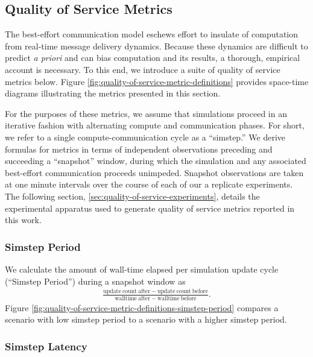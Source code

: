 \subsection{Quality of Service Metrics} \label{sec:quality-of-service-metrics}



The best-effort communication model eschews effort to insulate of computation from real-time message delivery dynamics.
Because these dynamics are difficult to predict \textit{a priori} and can bias computation and its results, a thorough, empirical account is necessary.
To this end, we introduce a suite of quality of service metrics below.
Figure \ref{fig:quality-of-service-metric-definitions} provides space-time diagrams illustrating the metrics presented in this section.

For the purposes of these metrics, we assume that simulations proceed in an iterative fashion with alternating compute and communication phases.
For short, we refer to a single compute-communication cycle as a ``simstep.''
We derive formulas for metrics in terms of independent observations preceding and succeeding a ``snapshot'' window, during which the simulation and any associated best-effort communication proceeds unimpeded.
Snapshot observations are taken at one minute intervals over the course of each of our a replicate experiments.
The following section, \ref{sec:quality-of-service-experiments}, details the experimental apparatus used to generate quality of service metrics reported in this work.

\subsubsection{Simstep Period} \label{sec:simstep-period-metric}

We calculate the amount of wall-time elapsed per simulation update cycle (``Simstep Period'') during a snapshot window as
\begin{align*}
\frac{
  \mathrm{update\ count\ after} - \mathrm{update\ count\ before}
}{
  \mathrm{walltime\ after} - \mathrm{walltime\ before}
}.
\end{align*}
Figure \ref{fig:quality-of-service-metric-definitions-simstep-period} compares a scenario with low simstep period to a scenario with a higher simstep period.

\subsubsection{Simstep Latency} \label{sec:wall-time-latency-metric}

